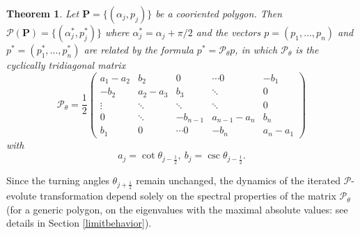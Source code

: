 \documentclass[12pt]{article}
\newtheorem{theorem}{Theorem}
\newcommand{\Pev}{\mathcal{P}}
\renewcommand{\P}{\mathbf{P}}
\begin{document}
\begin{theorem}
\label{CoordP}
Let $\P=\{(\alpha_j,p_j)\}$ be a cooriented polygon. Then  $\Pev(\P)=\{(\alpha^*_j,p^*_j)\}$ where $\alpha^*_j=\alpha_j+\pi/2$ and the vectors $p=(p_1,\dots,p_n)$ and $p^\ast=(p^\ast_1,\dots,p^\ast_n)$ are related by the formula $p^\ast=\Pev_\theta p$, in which $\Pev_\theta$ is the cyclically tridiagonal matrix
\begin{equation}
\label{eqnA}
\Pev_\theta = \frac12
\begin{pmatrix} 
a_1-a_2& b_2  & 0&\cdots 0&-b_1\\ -b_2& a_2-a_3 & b_3&\ddots & 0\\ \vdots&\ddots&\ddots &\ddots& 0\\ 0 &  \ddots     &   -b_{n-1} &a_{n-1}-a_n& b_n\\ b_1&0&\cdots  0&-b_n& a_n-a_1
\end{pmatrix}
\end{equation}
with
\[ a_j = \cot\theta_{j-\frac12},\  b_j = \csc\theta_{j-\frac12}. \]
\end{theorem}

Since the turning angles $\theta_{j+\frac12}$ remain unchanged, the dynamics of the iterated $\Pev$-evolute transformation depend solely on the spectral properties of the matrix $\Pev_{\theta}$ (for a generic polygon, on the  eigenvalues with the maximal absolute values: see details in Section \ref{limitbehavior}).
\end{document}

